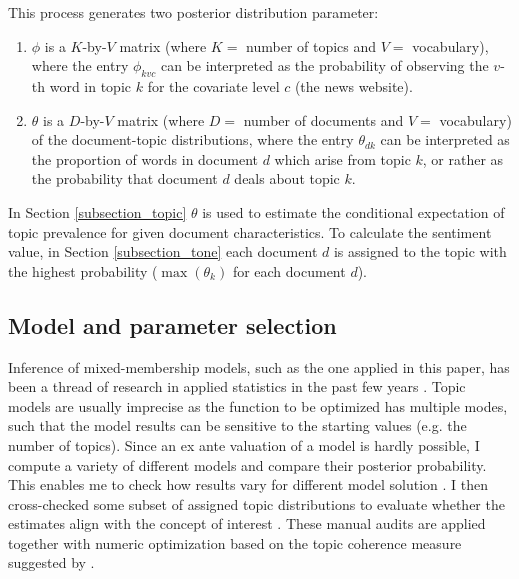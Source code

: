 \documentclass[12pt,a4paper,notitlepage]{article}
\begin{document}
This process generates two posterior distribution parameter: 

\begin{enumerate}
	\item $\phi$ is a $K$-by-$V$ matrix (where $K=$ number of topics and $V=$ vocabulary), where the entry $\phi_{kvc}$ can be interpreted as the probability of observing the $v$-th word in topic $k$ for the covariate level $c$ (the news website). 
	\item $\theta$ is a $D$-by-$V$ matrix (where $D=$ number of documents and $V=$ vocabulary) of the document-topic distributions, where the entry $\theta_{dk}$ can be interpreted as the proportion of words in document $d$ which arise from topic $k$, or rather as the probability that document $d$ deals about topic $k$. 
\end{enumerate}

In Section \ref{subsection_topic} $\theta$ is used to estimate the conditional expectation of topic prevalence for given document characteristics. To calculate the sentiment value, in Section \ref{subsection_tone} each document $d$ is assigned to the topic with the highest probability ($\max (\theta_{k})$ for each document $d$).

\subsection{Model and parameter selection}

Inference of mixed-membership models, such as the one applied in this paper, has been a thread of research in applied statistics in the past few years \citep{blei_latent_2003} \citep{erosheva_mixed-membership_2004} \citep{braun_variational_2010}. Topic models are usually imprecise as the function to be optimized has multiple modes, such that the model results can be sensitive to the starting values (e.g. the number of topics). Since an ex ante valuation of a model is hardly possible, I compute a variety of different models and compare their posterior probability. This enables me to check how results vary for different model solution \citep{roberts_navigating_2016}. I then cross-checked some subset of assigned topic distributions to evaluate whether the estimates align with the concept of interest \citep{gentzkow_text_2017}. These manual audits are applied together with numeric optimization based on the topic coherence measure suggested by \citet{mimno_optimizing_2011}. 
\end{document}
